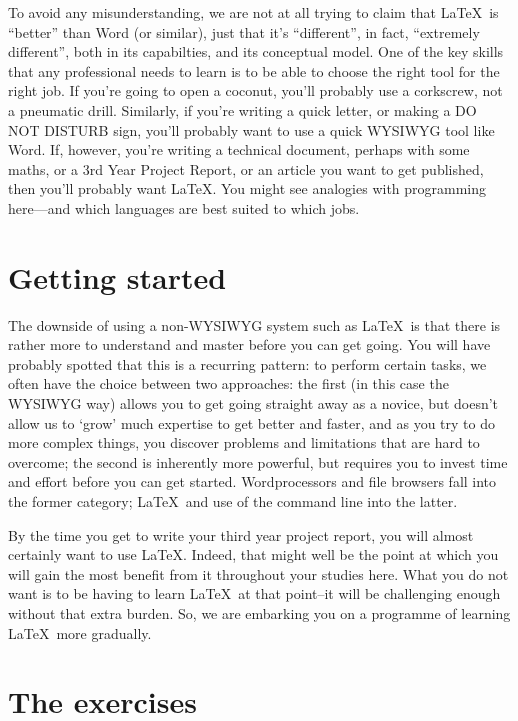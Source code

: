 \begin{refsection}
To avoid any  misunderstanding, we are not at all trying to claim that \LaTeX\ is ``better'' than Word (or similar), just that it's ``different'', in fact, ``extremely different'', both in its capabilties, and its conceptual model. One of the key skills that any professional needs to learn is to be able to choose the right tool for the right job. If you're going to open a coconut, you'll probably use a corkscrew, not a pneumatic drill. Similarly, if you're writing a quick letter, or making a DO NOT DISTURB sign, you'll probably want to use a quick WYSIWYG tool like Word. If, however, you're writing a technical document, perhaps with some maths, or a 3rd Year Project Report, or an article you want to get published, then you'll probably want \LaTeX.  You might see analogies with programming here---and which languages are best suited to which jobs.

\section{Getting started}

The downside of using a non-WYSIWYG system such as \LaTeX\ is that there is rather more to understand and master before you can get going. You will have probably spotted that this is a recurring pattern: to perform certain tasks, we often have the choice between two approaches: the first (in this case the WYSIWYG way) allows you to get going straight away as a novice, but doesn't allow us to `grow' much expertise to get better and faster, and as you try to do more complex things, you discover problems and limitations that are hard to overcome; the second is inherently more powerful, but requires you to invest time and effort before you can get started. Wordprocessors and file browsers fall into the former category; \LaTeX\ and use of the command line into the latter.

By the time you get to write your third year project report, you will almost certainly want to use \LaTeX. Indeed, that might well be the point at which you will gain the most benefit from it throughout your studies here. What you do not want is to be having to learn \LaTeX\ at that point--it will be challenging enough without that extra burden. So, we are embarking you on a programme of learning \LaTeX\ more gradually.


\section{The exercises}



\end{refsection}
